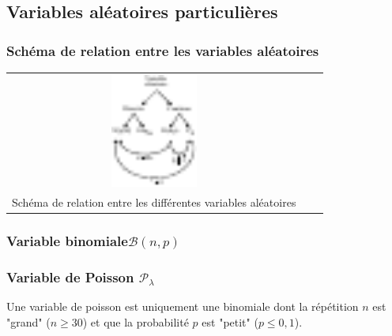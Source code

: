 \newpage
\subsection{Variables aléatoires particulières}

\subsubsection{Schéma de relation entre les variables aléatoires}
\begin{center}
	\begin{tabular}{ccc}
		\includegraphics[width=0.3\textwidth]{images/schema_relation_va.pdf}\\
		Schéma de relation entre les différentes variables aléatoires
	\end{tabular}
\end{center}

\subsubsection{Variable binomiale$\mathcal{B}(n,p)$}


\newpage
\subsubsection{Variable de Poisson $\mathcal{P}_\lambda$}
Une variable de poisson est uniquement une binomiale dont la répétition $n$ est "grand" ($n\geq30$) et que la probabilité $p$ est "petit" ($p\leq0,1$).

